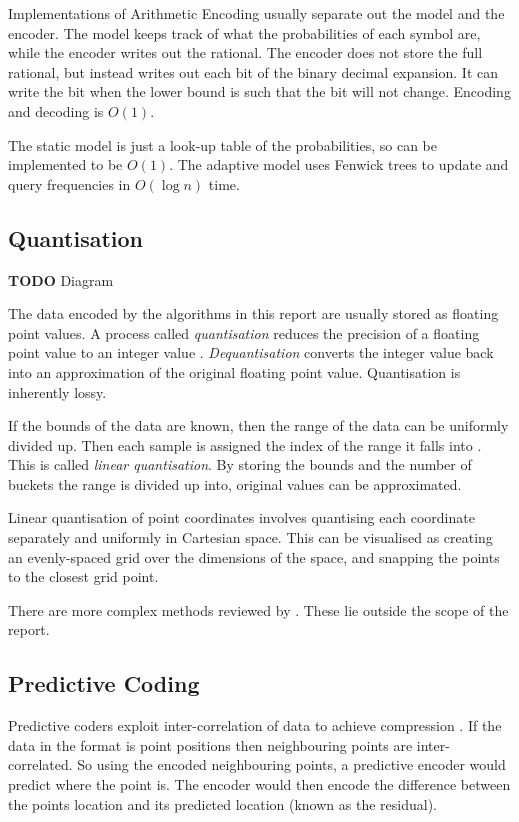 \documentclass[a4paper]{report}
\newcommand{\todo}{\textbf{TODO} }
\begin{document}
Implementations of Arithmetic Encoding usually separate out the model and the
encoder. The model keeps track of what the probabilities of each symbol are,
while the encoder writes out the rational. The encoder does not store the full
rational, but instead writes out each bit of the binary decimal expansion. It
can write the bit when the lower bound is such that the bit will not
change. Encoding and decoding is $O(1)$.

The static model is just a look-up table of the probabilities, so can be
implemented to be $O(1)$. The adaptive model uses Fenwick trees
\citep{fenwick1994new} to update and query frequencies in $O(\log n)$ time.


\subsection{Quantisation}

\todo Diagram

The data encoded by the algorithms in this report are usually stored as
floating point values. A process called \emph{quantisation} reduces the
precision of a floating point value to an integer value
\citep{ag-racm-03}. \emph{Dequantisation} converts the integer value back into
an approximation of the original floating point value. Quantisation is
inherently lossy.

If the bounds of the data are known, then the range of the data can be
uniformly divided up. Then each sample is assigned the index of the range it
falls into \citep{drozdek}. This is called \emph{linear quantisation}. By
storing the bounds and the number of buckets the range is divided up into,
original values can be approximated.

Linear quantisation of point coordinates involves quantising each coordinate
separately and uniformly in Cartesian space. This can be visualised as
creating an evenly-spaced grid over the dimensions of the space, and snapping
the points to the closest grid point.

There are more complex methods reviewed by \citet{ag-racm-03}. These lie
outside the scope of the report.


\subsection{Predictive Coding}

Predictive coders exploit inter-correlation of data to achieve compression
\citep{drozdek}. If the data in the format is point positions then
neighbouring points are inter-correlated. So using the encoded neighbouring
points, a predictive encoder would predict where the point is. The encoder
would then encode the difference between the points location and its predicted
location (known as the residual).
\end{document}
